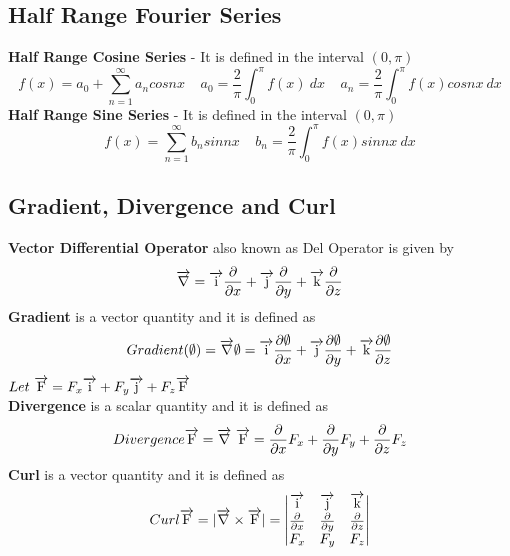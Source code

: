 \subsection*{Half Range Fourier Series}
\textbf{Half Range Cosine Series} - It is defined in the interval \((0, \pi)\)
\[f(x)=a_0+\sum_{n=1}^{\infty}a_n cosnx\ \ \ \ \ a_0=\frac{2}{\pi}\int_0^{\pi}f(x)\ dx\ \ \ \ \ a_n=\frac{2}{\pi}\int_0^{\pi}f(x)cosnx\ dx\]
\textbf{Half Range Sine Series} - It is defined in the interval \((0, \pi)\)
\[f(x)=\sum_{n=1}^{\infty}b_n sinnx\ \ \ \ \ b_n=\frac{2}{\pi}\int_0^{\pi}f(x)sinnx\ dx\]


\subsection{Gradient, Divergence and Curl}
\textbf{Vector Differential Operator} 
 also known as Del Operator is given by
\[\overrightarrow{\rm \nabla} = \overrightarrow{\rm i}\frac{\partial}{\partial x} + 
           \overrightarrow{\rm j}\frac{\partial}{\partial y} + 
           \overrightarrow{\rm k}\frac{\partial}{\partial z}\]
\textbf{Gradient} is a vector quantity and it is defined as \\
\[Gradient(\emptyset) = \overrightarrow{\rm \nabla}\emptyset = 
        \overrightarrow{\rm i}\frac{\partial\emptyset}{\partial x} + 
        \overrightarrow{\rm j}\frac{\partial\emptyset}{\partial y} + 
        \overrightarrow{\rm k}\frac{\partial\emptyset}{\partial z}\]
\(Let\ \overrightarrow{\rm F} = F_x\overrightarrow{\rm i}+F_y\overrightarrow{\rm j}
+F_z\overrightarrow{\rm F}\)\\
\textbf{Divergence} is a scalar quantity and it is defined as \\
\[Divergence\overrightarrow{\rm F}=\overrightarrow{\rm \nabla}\ \overrightarrow{\rm F} = 
\frac{\partial}{\partial x}F_x + \frac{\partial}{\partial y}F_y +
\frac{\partial}{\partial z}F_z\]
\textbf{Curl} is a vector quantity and it is defined as \\
\[Curl\overrightarrow{\rm F}=|\overrightarrow{\rm \nabla} \times \overrightarrow{\rm F}| =
\begin{vmatrix}
\overrightarrow{\rm i} & \overrightarrow{\rm j} & \overrightarrow{\rm k}\\ 
\frac{\partial}{\partial x} & \frac{\partial}{\partial y} & \frac{\partial}{\partial z} \\
F_x & F_y & F_z
\end{vmatrix}
\]

